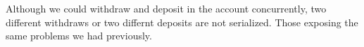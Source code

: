\documentclass[a4paper,12pt]{article}
\begin{document}
Although we could withdraw and deposit in the account concurrently,
two different withdraws or two differnt deposits are not serialized.
Those exposing the same problems we had previously.
\end{document}
